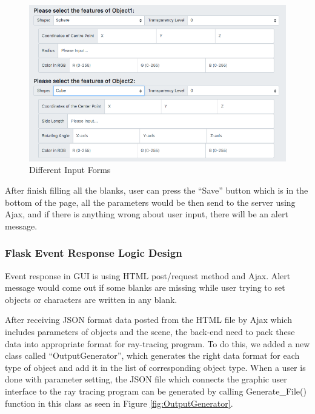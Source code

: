 \documentclass[a4paper, 12pt]{article}
\begin{document}
\begin{figure}
\centering
\includegraphics[scale=0.5]{GUI_Figure2.png}
\caption{Different Input Forms}
\label{fig:InputForms}
\end{figure}

After finish filling all the blanks, user can press the “Save” button which is in the bottom of the page, all the parameters would be then send to the server using Ajax, and if there is anything wrong about user input, there will be an alert message.

\subsubsection{Flask Event Response Logic Design}
Event response in GUI is using HTML post/request method and Ajax. Alert message would come out if some blanks are missing while user trying to set objects or characters are written in any blank.

After receiving JSON format data posted from the HTML file by Ajax which includes parameters of objects and the scene, the back-end need to pack these data into appropriate format for ray-tracing program.  To do this, we added a new class called “OutputGenerator”, which generates the right data format for each type of object and add it in the list of corresponding object type. When a user is done with parameter setting, the JSON file which connects the graphic user interface to the ray tracing program can be generated by calling Generate\_File() function in this class as seen in Figure \ref{fig:OutputGenerator}.
\end{document}
